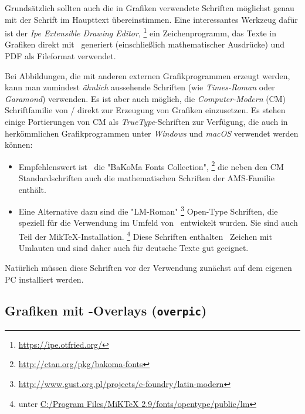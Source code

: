 Grundsätzlich sollten auch die in Grafiken verwendete Schriften möglichst genau
mit der Schrift im Haupttext übereinstimmen. Eine interessantes Werkzeug dafür
ist der \emph{Ipe Extensible Drawing Editor},%
\footnote{\url{https://ipe.otfried.org/}}
ein Zeichenprogramm, das Texte in Grafiken direkt mit \latex\ generiert
(einschließlich mathematischer Ausdrücke) und PDF als Fileformat verwendet.

Bei Abbildungen, die mit anderen externen Grafikprogrammen erzeugt werden, kann
man zumindest \emph{ähnlich} aussehende Schriften (wie \emph{Times-Roman} oder
\emph{Garamond}) verwenden. Es ist aber auch möglich, die 
\emph{Computer-Modern} (CM) Schriftfamilie von {\tex}/{\latex} direkt
zur Erzeugung von Grafiken einzusetzen.
Es stehen einige Portierungen von CM als \emph{TrueType}-Schriften zur
Verfügung, die auch in herkömmlichen Grafikprogrammen unter \emph{Windows}
und \emph{macOS} verwendet werden können:
%
\begin{itemize}
\item	%
Empfehlenswert ist \zB\ die "BaKoMa Fonts Collection",%
\footnote{\url{http://ctan.org/pkg/bakoma-fonts}}
die neben den CM Standardschriften auch die mathematischen Schriften der
AMS-Familie ent\-hält. 
\item	%
Eine Alternative dazu sind die "LM-Roman"%
\footnote{\url{http://www.gust.org.pl/projects/e-foundry/latin-modern}}
Open-Type Schriften, die speziell für die Verwendung im Umfeld von \latex\
entwickelt wurden. Sie sind auch Teil der MikTeX-Installation.%
\footnote{\zB unter \url{C:/Program Files/MiKTeX 2.9/fonts/opentype/public/lm}}
Diese Schriften enthalten \ua\ Zeichen mit Umlauten und sind daher auch für 
deutsche Texte gut geeignet.
\end{itemize}
%
Natürlich müssen diese Schriften vor der Verwendung zunächst auf dem eigenen PC
installiert werden.

\subsection{Grafiken mit \latex-Overlays (\texttt{overpic})}
\label{sec:GraphicOverlays}

